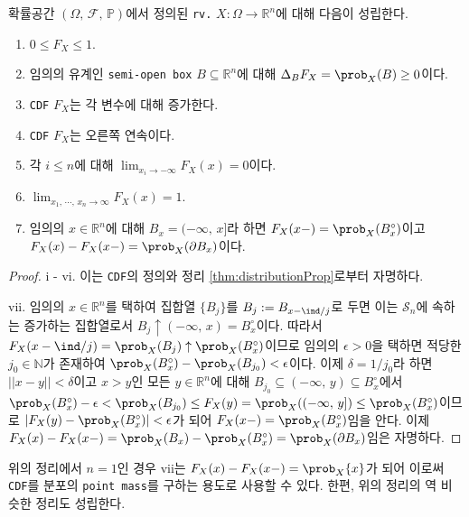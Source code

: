 \begin{theorem}
    확률공간 $(\Omega,\,\mathcal{F},\,\mathbb{P})$에서 정의된 \texttt{rv.} $X:\Omega\to\mathbb{R}^n$에 대해 다음이 성립한다.
    \begin{enumerate}
        \item $0\leq F_X\leq 1$.
        \item 임의의 유계인 \texttt{semi-open box} $B\subseteq\mathbb{R}^n$에 대해 $\Delta_BF_X=\prob_X(B)\geq0$이다.
        \item \texttt{CDF} $F_X$는 각 변수에 대해 증가한다.
        \item \texttt{CDF} $F_X$는 오른쪽 연속이다.
        \item 각 $i\leq n$에 대해 $\lim_{x_i\to-\infty}F_X(x)=0$이다.\footnotemark
        \item $\lim_{x_1,\,\cdots,\,x_n\to\infty}F_X(x)=1$.\footnotemark
        \item 임의의 $x\in\mathbb{R}^n$에 대해 $B_x=(-\infty,\,x]$라 하면 $F_X(x-)=\prob_X(B_x^\circ)$이고 $F_X(x)-F_X(x-)=\prob_X(\partial B_x)$이다.
    \end{enumerate}
\end{theorem}

\begin{proof}
    i - vi. 이는 \texttt{CDF}의 정의와 정리 \ref{thm:distributionProp}로부터 자명하다.
    
    vii. 임의의 $x\in\mathbb{R}^n$를 택하여 집합열 $\{B_j\}$를 $B_j:=B_{x-\ind/j}$로 두면 이는 $\mathcal{S}_n$에 속하는 증가하는 집합열로서 $B_j\uparrow(-\infty,\,x)=B_x^\circ$이다. 따라서 $F_X(x-\ind/j)=\prob_X(B_j)\uparrow\prob_X(B_x^\circ)$이므로 임의의 $\epsilon>0$을 택하면 적당한 $j_0\in\mathbb{N}$가 존재하여 $\prob_X(B_x^\circ)-\prob_X(B_{j_0})<\epsilon$이다. 이제 $\delta=1/j_0$라 하면 $||x-y||<\delta$이고 $x>y$인 모든 $y\in\mathbb{R}^n$에 대해 $B_{j_0}\subseteq(-\infty,\,y)\subseteq B_x^\circ$에서 $\prob_X(B_x^\circ)-\epsilon<\prob_X(B_{j_0})\leq F_X(y)=\prob_X((-\infty,\,y])\leq\prob_X(B_x^\circ)$이므로 $|F_X(y)-\prob_X(B_x^\circ)|<\epsilon$가 되어 $F_X(x-)=\prob_X(B_x^\circ)$임을 안다. 이제 $F_X(x)-F_X(x-)=\prob_X(B_x)-\prob_X(B_x^\circ)=\prob_X(\partial B_x)$임은 자명하다.
\end{proof}

위의 정리에서 $n=1$인 경우 vii는 $F_X(x)-F_X(x-)=\prob_X\{x\}$가 되어 이로써 \texttt{CDF}를 분포의 \texttt{point mass}를 구하는 용도로 사용할 수 있다. 한편, 위의 정리의 역 비슷한 정리도 성립한다.

